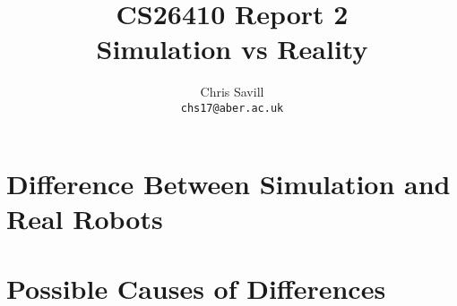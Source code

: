 \documentclass[a4paper,12pt]{article}
\title{CS26410 Report 2\\
Simulation vs Reality}
\author{Chris Savill\\\texttt{chs17@aber.ac.uk}}
\begin{document}
\maketitle
\newpage
\tableofcontents
\newpage

\section{Difference Between Simulation and Real Robots}

\section{Possible Causes of Differences}
\end{document}
